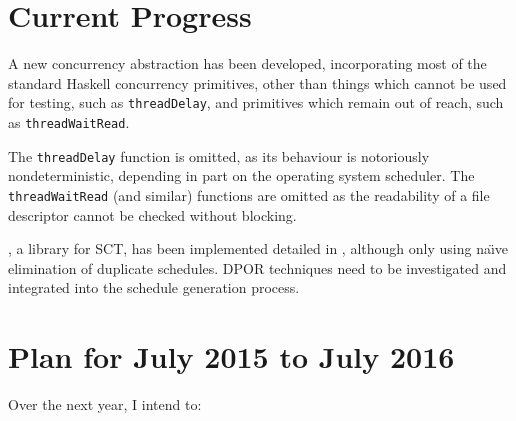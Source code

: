 \section{Current Progress}
\label{sec:proposal-progress}

A new concurrency abstraction has been developed, incorporating most
of the standard Haskell concurrency primitives, other than things
which cannot be used for testing, such as \verb|threadDelay|, and
primitives which remain out of reach, such as \verb|threadWaitRead|.

The \verb|threadDelay| function is omitted, as its behaviour is
notoriously nondeterministic, depending in part on the operating
system scheduler. The \verb|threadWaitRead| (and similar) functions
are omitted as the readability of a file descriptor cannot be checked
without blocking.

\dejafu{}, a library for SCT, has been implemented detailed in
, although only using na\"{\i}ve elimination of duplicate
schedules. DPOR techniques need to be investigated and integrated into
the schedule generation process.

\section{Plan for July 2015 to July 2016}
\label{sec:proposal-plan}

Over the next year, I intend to:

